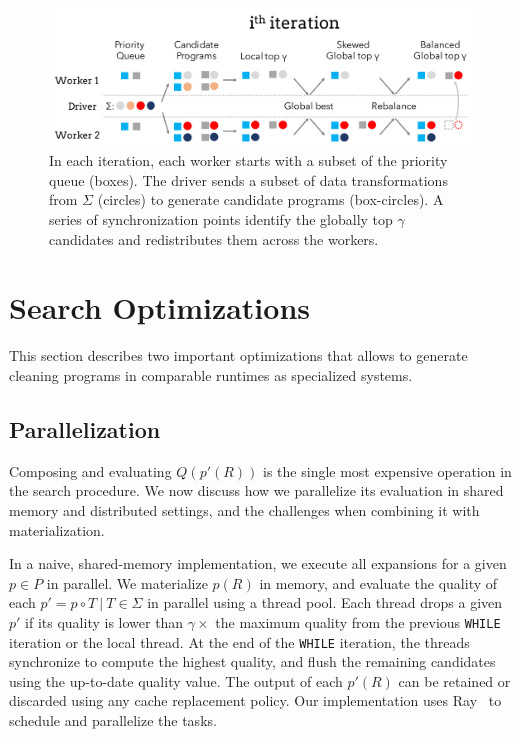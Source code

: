 \begin{figure}[h]
    \centering
    \includegraphics[width=\columnwidth]{figures/distributed.pdf}
    \vspace{1pt}
    \caption{In each iteration, each worker starts with a subset of the priority queue (boxes).  The driver sends a subset of data transformations from $\Sigma$ (circles) to generate candidate programs (box-circles).  A series of synchronization points identify the globally top $\gamma$ candidates and redistributes them across the workers.   \label{fig:algo}}
\end{figure}

\section{Search Optimizations}\label{s:opts}
This section describes two important optimizations that allows \sys to generate cleaning programs in comparable runtimes as specialized systems.

\subsection{Parallelization}\label{s:parallel}
Composing and evaluating $Q(p'(R))$ is the single most expensive operation in the search procedure.   We now discuss how we parallelize its evaluation in shared memory and distributed settings, and the challenges when combining it with materialization.

 In a naive, shared-memory implementation, we execute all expansions for a given $p\in P$ in parallel.  We materialize $p(R)$ in memory, and evaluate the quality of each $p' = p\circ T\ |\ T \in \Sigma$ in parallel using a  thread pool.  Each thread drops a given $p'$ if its quality is lower than $\gamma\times$ the maximum quality from the previous \texttt{WHILE} iteration or the local thread.  At the end of the \texttt{WHILE} iteration, the threads synchronize to compute the highest quality, and flush the remaining candidates using the up-to-date quality value.  The output of each $p'(R)$ can be retained or discarded using any cache replacement policy.  Our implementation uses Ray~\cite{ray} to schedule and parallelize the tasks.

